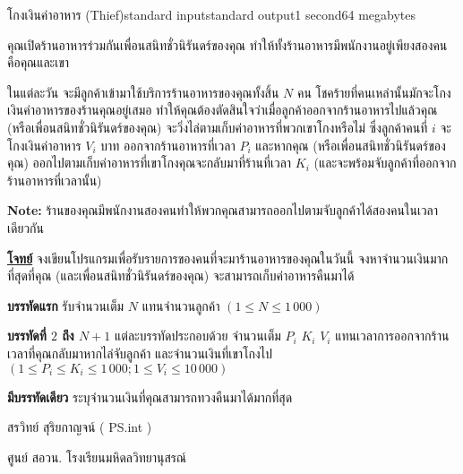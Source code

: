 \documentclass[11pt,a4paper]{article}
\begin{document}
\begin{problem}{โกงเงินค่าอาหาร (Thief)}{standard input}{standard output}{1 second}{64 megabytes}

คุณเปิดร้านอาหารร่วมกันเพื่อนสนิทชั่วนิรันดร์ของคุณ ทำให้ทั้งร้านอาหารมีพนักงานอยู่เพียงสองคนคือคุณและเขา

                ในแต่ละวัน จะมีลูกค้าเข้ามาใช้บริการร้านอาหารของคุณทั้งสิ้น $N$ คน โชคร้ายที่คนเหล่านั้นมักจะโกงเงินค่าอาหารของร้านคุณอยู่เสมอ ทำให้คุณต้องตัดสินใจว่าเมื่อลูกค้าออกจากร้านอาหารไปแล้วคุณ (หรือเพื่อนสนิทชั่วนิรันดร์ของคุณ) จะวิ่งไล่ตามเก็บค่าอาหารที่พวกเขาโกงหรือไม่ ซึ่งลูกค้าคนที่ $i$ จะโกงเงินค่าอาหาร $V_i$ บาท ออกจากร้านอาหารที่เวลา $P_i$ และหากคุณ (หรือเพื่อนสนิทชั่วนิรันดร์ของคุณ) ออกไปตามเก็บค่าอาหารที่เขาโกงคุณจะกลับมาที่ร้านที่เวลา $K_i$  (และจะพร้อมจับลูกค้าที่ออกจากร้านอาหารที่เวลานั้น)

                
\textbf{Note:} ร้านของคุณมีพนักงานสองคนทำให้พวกคุณสามารถออกไปตามจับลูกค้าได้สองคนในเวลาเดียวกัน

\bigskip
\underline{\textbf{โจทย์}}  จงเขียนโปรแกรมเพื่อรับรายการของคนที่จะมาร้านอาหารของคุณในวันนี้ จงหาจำนวนเงินมากที่สุดที่คุณ (และเพื่อนสนิทชั่วนิรันดร์ของคุณ) จะสามารถเก็บค่าอาหารคืนมาได้


\InputFile

\textbf{บรรทัดแรก} รับจำนวนเต็ม $N$ แทนจำนวนลูกค้า $( 1 \leq N \leq 1\,000 )$

\textbf{บรรทัดที่ $2$ ถึง $N+1$ }แต่ละบรรทัดประกอบด้วย จำนวนเต็ม $P_i$ $K_i$ $V_i$ แทนเวลาการออกจากร้าน เวลาที่คุณกลับมาหากไล่จับลูกค้า และจำนวนเงินที่เขาโกงไป $( 1 \leq P_i \leq K_i \leq 1\,000 ; 1 \leq V_i \leq 10\,000 )$


\OutputFile

\textbf{มีบรรทัดเดียว} ระบุจำนวนเงินที่คุณสามารถทวงคืนมาได้มากที่สุด

\Examples

\begin{example}
%
%
\end{example}


\Source

สรวิทย์  สุริยกาญจน์ ( PS.int )

ศูนย์ สอวน. โรงเรียนมหิดลวิทยานุสรณ์

\end{problem}
\end{document}
